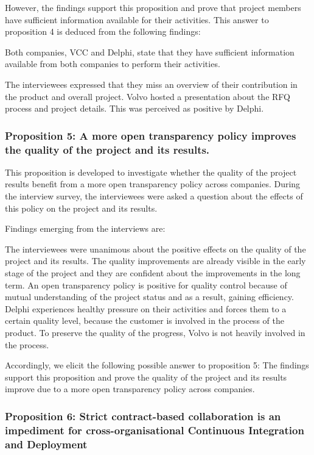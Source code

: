 However, the findings support this proposition and prove that project members have sufficient information available for their activities. This answer to proposition 4 is deduced from the following findings:

 Both companies, VCC and Delphi, state that they have sufficient information available from both companies to perform their activities. 

 The interviewees expressed that they miss an overview of their contribution in the product and overall project. Volvo hosted a presentation about the RFQ process and project details. This was perceived as positive by Delphi.


\subsubsection{Proposition 5: A more open transparency policy improves the quality of the project and its results.}

This proposition is developed to investigate whether the quality of the project results benefit from a more open transparency policy across companies. During the interview survey, the interviewees were asked a question about the effects of this policy on the project and its results. 

Findings emerging from the interviews are:

 The interviewees were unanimous about the positive effects on the quality of the project and its results. The quality improvements are already visible in the early stage of the project and they are confident about the improvements in the long term. An open transparency policy is positive for quality control because of mutual understanding of the project status and as a result, gaining efficiency. Delphi experiences healthy pressure on their activities and forces them to a certain quality level, because the customer is involved in the process of the product. To preserve the quality of the progress, Volvo is not heavily involved in the process.


Accordingly, we elicit the following possible answer to proposition 5:
The findings support this proposition and prove the quality of the project and its results improve due to a more open transparency policy across companies.

\subsubsection{Proposition 6: Strict contract-based collaboration is an impediment for cross-organisational Continuous Integration and Deployment}

